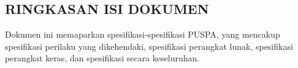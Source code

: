 \subsection*{\textcolor{subsectioncolor}{\textsf{RINGKASAN ISI DOKUMEN}}}

Dokumen ini memaparkan spesifikasi-spesifikasi PUSPA, yang mencakup spesifikasi perilaku yang dikehendaki, spesifikasi perangkat lunak, spesifikasi perangkat keras, dan spesifikasi secara keseluruhan.
